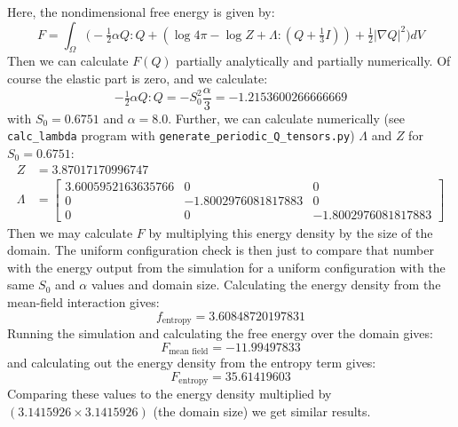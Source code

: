 \documentclass[reqno]{article}
\begin{document}
Here, the nondimensional free energy is given by:
\begin{equation}
    F
    =
    \int_\Omega
    \biggl(
    - \tfrac12 \alpha Q : Q
    + \left( \log 4 \pi - \log Z + \Lambda : \left( Q + \tfrac13 I \right) \right)
    + \tfrac12 \left| \nabla Q \right|^2
    \biggr)
    dV
\end{equation}
Then we can calculate $F(Q)$ partially analytically and partially numerically.
Of course the elastic part is zero, and we calculate:
\begin{equation}
    -\tfrac12 \alpha Q:Q
    =
    - S_0^2 \frac{\alpha}{3} 
    =
    -1.2153600266666669
\end{equation}
with $S_0 = 0.6751$ and $\alpha = 8.0$.
Further, we can calculate numerically (see \verb|calc_lambda| program with \verb|generate_periodic_Q_tensors.py|) $\Lambda$ and $Z$ for $S_0 = 0.6751$:
\begin{equation}
    \begin{split}
        Z &= 3.87017170996747 \\
        \Lambda 
        &= 
        \begin{bmatrix}
            3.6005952163635766 &0 &0 \\
            0 &-1.8002976081817883 &0 \\
            0 &0 &-1.8002976081817883
        \end{bmatrix}
    \end{split}
\end{equation}
Then we may calculate $F$ by multiplying this energy density by the size of the domain.
The uniform configuration check is then just to compare that number with the energy output from the simulation for a uniform configuration with the same $S_0$ and $\alpha$ values and domain size.
Calculating the energy density from the mean-field interaction gives:
\begin{equation}
    f_\text{entropy}
    =
    3.60848720197831
\end{equation}
Running the simulation and calculating the free energy over the domain gives:
\begin{equation}
    F_\text{mean field}
    =
    -11.99497833
\end{equation}
and calculating out the energy density from the entropy term gives:
\begin{equation}
    F_\text{entropy}
    =
    35.61419603
\end{equation}
Comparing these values to the energy density multiplied by $(3.1415926 \times 3.1415926)$ (the domain size) we get similar results.
\end{document}
